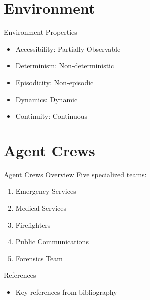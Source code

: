 \documentclass{beamer}
\begin{document}
\section{Environment}
\begin{frame}{Environment Properties}
    \begin{itemize}
        \item Accessibility: Partially Observable
        \item Determinism: Non-deterministic
        \item Episodicity: Non-episodic
        \item Dynamics: Dynamic
        \item Continuity: Continuous
    \end{itemize}
\end{frame}

\section{Agent Crews}
\begin{frame}{Agent Crews Overview}
    Five specialized teams:
    \begin{enumerate}
        \item Emergency Services
        \item Medical Services
        \item Firefighters
        \item Public Communications
        \item Forensics Team
    \end{enumerate}
\end{frame}







\begin{frame}{References}
    \begin{itemize}
        \item Key references from bibliography
    \end{itemize}
\end{frame}
\end{document}
